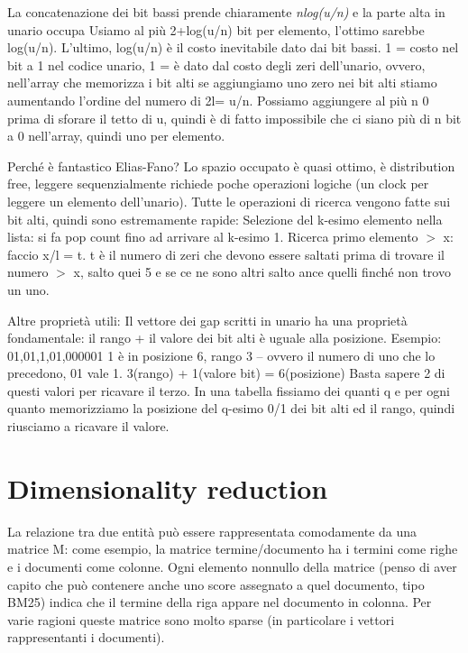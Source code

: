 \documentclass[12pt,italian]{report}
\begin{document}
\bigbreak
La concatenazione dei bit bassi prende chiaramente \textit{nlog(u/n)} e la parte alta in unario occupa 
Usiamo al più 2+log(u/n) bit per elemento, l'ottimo sarebbe log(u/n). L'ultimo, log(u/n) è il costo inevitabile dato dai bit bassi. 1 = costo nel bit a 1 nel codice unario, 1 = è dato dal costo degli zeri dell’unario, ovvero, nell’array che memorizza i bit alti se aggiungiamo uno zero nei bit alti stiamo aumentando l’ordine del numero di 2l= u/n. Possiamo aggiungere al più n 0 prima di sforare il tetto di u, quindi è di fatto impossibile che ci siano più di n bit a 0 nell’array, quindi uno per elemento. 

Perché è fantastico Elias-Fano? Lo spazio occupato è quasi ottimo, è distribution free, leggere sequenzialmente richiede poche operazioni logiche (un clock per leggere un elemento dell’unario).  Tutte le operazioni di ricerca vengono fatte sui bit alti, quindi sono estremamente rapide:
Selezione del k-esimo elemento nella lista: si fa pop count fino ad arrivare al k-esimo 1. 
Ricerca primo elemento $>$ x:  faccio x/l = t. t è il numero di zeri che devono essere saltati prima di trovare il numero $>$ x, salto quei 5 e se ce ne sono altri salto ance quelli finché non trovo un uno. 

Altre proprietà utili: 
Il vettore dei gap scritti in unario ha una proprietà fondamentale: il rango + il valore dei bit alti è uguale alla posizione. 
Esempio: 01,01,1,01,000001
1 è in posizione 6, rango 3 – ovvero il numero di uno che lo precedono, 01 vale 1. 
3(rango) + 1(valore bit)  = 6(posizione)
Basta sapere 2 di questi valori per ricavare il terzo. In una tabella fissiamo dei quanti q e per ogni quanto memorizziamo la posizione del q-esimo 0/1 dei bit alti ed il rango, quindi riusciamo a ricavare il valore.

\chapter{Dimensionality reduction}
\label{dimensionalityreduction}
La relazione tra due entità può essere rappresentata comodamente da una matrice M: come esempio, la matrice termine/documento ha i termini come righe e i documenti come colonne. Ogni elemento nonnullo della matrice  (penso di aver capito che può contenere anche uno score assegnato a quel documento, tipo BM25) indica che il termine della riga appare nel documento in colonna. Per varie ragioni queste matrice sono molto sparse (in particolare i vettori rappresentanti i documenti).
\end{document}
